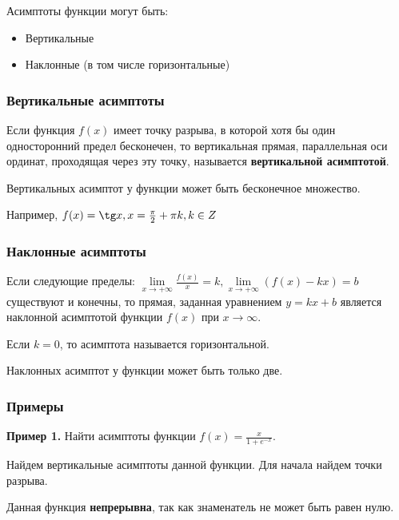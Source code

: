\documentclass{article}
\begin{document}
\begin{flushleft}

Асимптоты функции могут быть:
\begin{itemize}
    \item Вертикальные
    \item Наклонные (в том числе горизонтальные)
\end{itemize}

\subsubsection{Вертикальные асимптоты}

Если функция $f(x)$ имеет точку разрыва, в которой хотя бы один односторонний предел бесконечен, то вертикальная прямая, параллельная оси ординат, проходящая через эту точку, называется \textbf{вертикальной асимптотой}.

\hfill

Вертикальных асимптот у функции может быть бесконечное множество.

\hfill

Например, $f(x) = \tg x, x = \frac{\pi}{2} + \pi k, k \in Z$

\subsubsection{Наклонные асимптоты}

Если следующие пределы: $\lim\limits_{x \to +\infty} \frac{f(x)}{x} = k, \lim\limits_{x \to +\infty} (f(x) - k x) = b$ существуют и конечны, то прямая, заданная уравнением $y = k x + b$ является наклонной асимптотой функции $f(x)$ при $x \to \infty$.

\hfill

Если $k = 0$, то асимптота называется горизонтальной.

\hfill

Наклонных асимптот у функции может быть только две.

\subsubsection{Примеры}

\textbf{Пример 1.} Найти асимптоты функции $f(x) = \frac{x}{1 + e^{-x}}$.

\hfill

Найдем вертикальные асимптоты данной функции. Для начала найдем точки разрыва.

Данная функция \textbf{непрерывна}, так как знаменатель не может быть равен нулю.


\end{flushleft}
\end{document}
